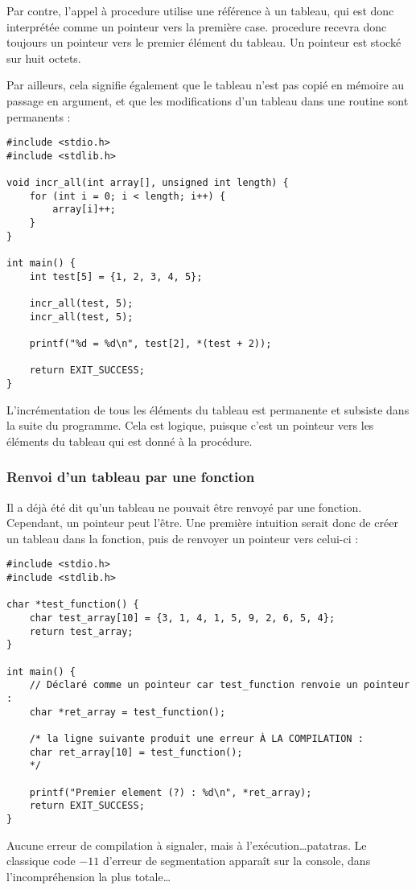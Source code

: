 \documentclass[../../../main.tex]{subfiles}
\begin{document}
Par contre, l'appel à \textsf{procedure} utilise une référence à un tableau, qui est donc interprétée comme un pointeur vers la première case. \textsf{procedure} recevra donc toujours un pointeur vers le premier élément du tableau. Un pointeur est stocké sur huit octets.
 
Par ailleurs, cela signifie également que le tableau n'est pas copié en mémoire au passage en argument, et que les modifications d'un tableau dans une routine sont permanents :
\begin{verbatim}
#include <stdio.h>
#include <stdlib.h>

void incr_all(int array[], unsigned int length) {
	for (int i = 0; i < length; i++) {
		array[i]++;
	}
}

int main() {
	int test[5] = {1, 2, 3, 4, 5};
	
	incr_all(test, 5);
	incr_all(test, 5);

	printf("%d = %d\n", test[2], *(test + 2)); 

	return EXIT_SUCCESS;
}
\end{verbatim}
L'incrémentation de tous les éléments du tableau est permanente et subsiste dans la suite du programme. Cela est logique, puisque c'est un pointeur vers les éléments du tableau qui est donné à la procédure.
\subsubsection{Renvoi d'un tableau par une fonction}
\label{ssub:renvoi_d_un_tableau_par_une_fonction}
Il a déjà été dit qu'un tableau ne pouvait être renvoyé par une fonction. Cependant, un pointeur peut l'être. Une première intuition serait donc de créer un tableau dans la fonction, puis de renvoyer un pointeur vers celui-ci :
\begin{verbatim}
#include <stdio.h>
#include <stdlib.h>

char *test_function() {
	char test_array[10] = {3, 1, 4, 1, 5, 9, 2, 6, 5, 4};
	return test_array;
}

int main() {
	// Déclaré comme un pointeur car test_function renvoie un pointeur :
	char *ret_array = test_function();
	
	/* la ligne suivante produit une erreur À LA COMPILATION :
	char ret_array[10] = test_function();
	*/
	
	printf("Premier element (?) : %d\n", *ret_array);
	return EXIT_SUCCESS;
}
\end{verbatim}
Aucune erreur de compilation à signaler, mais à l'exécution\dots patatras. Le classique code $-11$ d'erreur de segmentation apparaît sur la console, dans l'incompréhension la plus totale\dots
 
\end{document}
